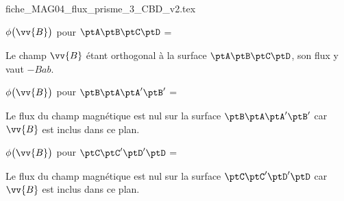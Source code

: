 \begin{center}
{fiche_MAG04_flux_prisme_3_CBD_v2.tex}
\end{center}

\debutEntrainement

\begin{enonce}
$\phi \big(\vv{B} \big)$ pour $\ptA\ptB\ptC\ptD$ =
\end{enonce}
%

\begin{corrige}
Le champ $\vv{B}$ étant orthogonal à la surface $\ptA\ptB\ptC\ptD$, son flux y vaut $-Bab$.
\end{corrige}





\begin{enonce}
$\phi \big(\vv{B} \big)$ pour $\ptB\ptA\ptA'\ptB'$ =
\end{enonce}

\begin{corrigeNewpage}
Le flux du champ magnétique est nul sur la surface $\ptB\ptA\ptA'\ptB'$ car $\vv{B}$ est inclus dans ce plan.
\end{corrigeNewpage}




\begin{enonce}
$\phi \big(\vv{B} \big)$ pour $\ptC\ptC'\ptD'\ptD$ =
\end{enonce}

\begin{corrige}
Le flux du champ magnétique est nul sur la surface $\ptC\ptC'\ptD'\ptD$ car $\vv{B}$ est inclus dans ce plan.
\end{corrige}




